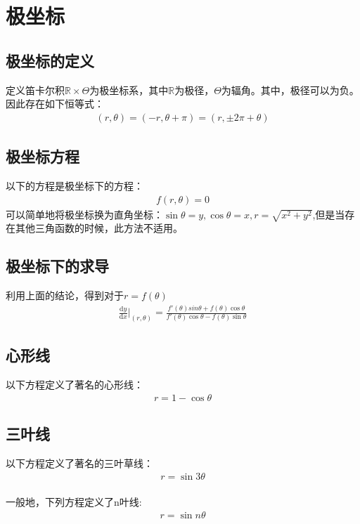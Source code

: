 \documentclass[12pt,a4paper,UTF8]{ctexbook}
\theoremstyle{plain}
\begin{document}
\section{极坐标}
\subsection{极坐标的定义}
定义笛卡尔积$\mathbb{R}\times \Theta$为极坐标系，其中$\mathbb{R}$为极径，$\Theta$为辐角。其中，极径可以为负。
因此存在如下恒等式：
\begin{align*}
    (r,\theta)=(-r,\theta+\pi)=(r,\pm 2\pi+\theta)
\end{align*}
\subsection{极坐标方程}
以下的方程是极坐标下的方程：
\begin{align*}
    f(r,\theta)=0
\end{align*}
可以简单地将极坐标换为直角坐标：$\sin\theta = y, \cos \theta = x, r=\sqrt{x^2+y^2}$,但是当存在其他三角函数的时候，此方法不适用。
\subsection{极坐标下的求导}
利用上面的结论，得到对于$r=f(\theta)$
\begin{align*}
    \frac{\mathrm d y}{\mathrm d x}\bigg|_{(r,\theta)}=\frac{f'(\theta)sin\theta +f(\theta)\cos \theta}{f'(\theta)\cos \theta -f(\theta)\sin\theta}
\end{align*}
\subsection{心形线}
以下方程定义了著名的心形线：
\begin{align*}
    r=1-\cos \theta
\end{align*}
\subsection{三叶线}
以下方程定义了著名的三叶草线：
\begin{align*}
    r=\sin 3\theta
\end{align*}
\paragraph{}一般地，下列方程定义了n叶线:
\begin{align*}
    r=\sin n\theta
\end{align*}
\end{document}

